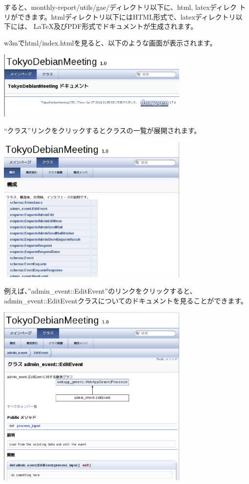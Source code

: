 \documentclass[mingoth,a4paper]{jsarticle}
\begin{document}
すると、monthly-report/utils/gae/ディレクトリ以下に、html, latexディレク
トリができます。htmlディレクトリ以下にはHTML形式で、latexディレクトリ以
下には、 \LaTeX 及びPDF形式でドキュメントが生成されます。

w3mでhtml/index.htmlを見ると、以下のような画面が表示されます。

\begin{center}
\includegraphics[width=9.5cm]{image201106/doxygen0.eps}
\end{center}

``クラス''リンクをクリックするとクラスの一覧が展開されます。
\begin{center}
\includegraphics[width=9.5cm]{image201106/doxygen1.eps}
\end{center}

例えば、''admin\_event::EditEvent''のリンクをクリックすると、admin\_event::EditEventクラスについてのドキュメントを見ることができます。
\begin{center}
\includegraphics[width=9.5cm]{image201106/doxygen2.eps}
\end{center}
\end{document}
